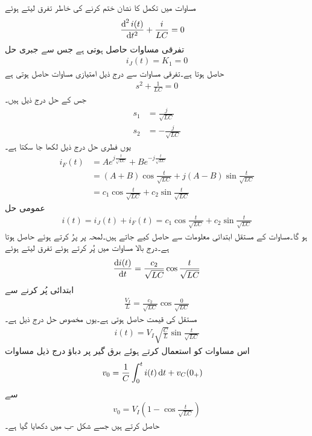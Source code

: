 مساوات  میں تکمل کا نشان ختم کرنے کی خاطر تفرق لیتے ہوئے
\begin{align*}
\frac{\dif^{\, 2} i(t)}{\dif t^2}+\frac{i}{LC}&=0
\end{align*}
تفرقی مساوات حاصل ہوتی ہے جس سے جبری حل
\begin{align*}
i_J(t)=K_1=0
\end{align*}
حاصل ہوتا ہے۔تفرقی مساوات سے درج ذیل امتیازی مساوات حاصل ہوتی ہے
\begin{align*}
s^2+\frac{1}{LC}=0
\end{align*}
جس کے حل درج ذیل ہیں۔
\begin{align*}
s_1&=\frac{j}{\sqrt{LC}}\\
s_2&=-\frac{j}{\sqrt{LC}}
\end{align*}
یوں فطری حل درج ذیل لکھا جا سکتا ہے۔
\begin{align*}
i_F(t)&=A e^{j\frac{t}{\sqrt{LC}}}+Be^{-j\frac{t}{\sqrt{LC}}}\\
&=(A+B) \cos \frac{t}{\sqrt{LC}}+j(A-B) \sin \frac{t}{\sqrt{LC}}\\
&=c_1\cos \frac{t}{\sqrt{LC}}+c_2\sin \frac{t}{\sqrt{LC}}
\end{align*}
عمومی حل
\begin{align*}
i(t)=i_J(t)+i_F(t)=c_1\cos \frac{t}{\sqrt{LC}}+c_2\sin \frac{t}{\sqrt{LC}}
\end{align*}
ہو گا۔مساوات کے مستقل ابتدائی معلومات سے حاصل کیے جاتے ہیں۔لمحہ  پر  پرُ کرتے ہوئے  حاصل ہوتا ہے۔درج بالا مساوات میں  پُر کرتے ہوئے تفرق لیتے ہوئے
\begin{align*}
\frac{\dif i(t)}{\dif t}=\frac{c_2}{\sqrt{LC}}\cos \frac{t}{\sqrt{LC}}
\end{align*}
ابتدائی  پُر کرنے سے
\begin{align*}
\frac{V_I}{L}=\frac{c_2}{\sqrt{LC}}\cos \frac{0}{\sqrt{LC}}
\end{align*}
مستقل کی قیمت  حاصل ہوتی ہے۔یوں مخصوص حل درج ذیل ہے۔
\begin{align}\label{مساوات_عارضی_امالہ_برق_گیر_رو}
i(t)=V_I\sqrt{\frac{C}{L}} \sin \frac{t}{\sqrt{LC}}
\end{align}
اس مساوات کو استعمال کرتے ہوئے برق گیر پر دباؤ   درج ذیل مساوات
\begin{align*}
v_0&=\frac{1}{C}\int_{0}^{t} i(t) \dif t+v_C(0_+)
\end{align*}
سے
\begin{align}\label{مساوات_عارضی_امالہ_برق_گیر_دگنا_دباو}
v_0=V_I\left(1-\cos \frac{t}{\sqrt{LC}} \right)
\end{align}
حاصل کرتے ہیں جسے شکل -ب میں دکھایا گیا ہے۔

